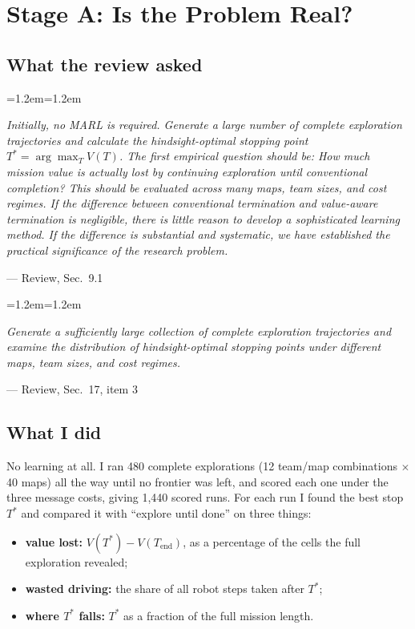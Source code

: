 \documentclass[11pt,a4paper]{article}
\newenvironment{review}[1]
  {\par\smallskip\noindent\begin{minipage}{\linewidth}\begin{list}{}{\leftmargin=1.2em\rightmargin=1.2em}\item[]%
   \def\reviewsrc{#1}\small\itshape\color{black!80}}
  {\par\hfill\upshape\footnotesize --- Review, \reviewsrc\end{list}\end{minipage}\par\smallskip}
\begin{document}
\section{Stage A: Is the Problem Real?}

\subsection{What the review asked}

\begin{review}{Sec.~9.1}
Initially, no MARL is required. Generate a large number of complete exploration trajectories and calculate the hindsight-optimal stopping point $T^* = \arg\max_T V(T)$. The first empirical question should be: How much mission value is actually lost by continuing exploration until conventional completion? This should be evaluated across many maps, team sizes, and cost regimes. If the difference between conventional termination and value-aware termination is negligible, there is little reason to develop a sophisticated learning method. If the difference is substantial and systematic, we have established the practical significance of the research problem.
\end{review}

\begin{review}{Sec.~17, item 3}
Generate a sufficiently large collection of complete exploration trajectories and examine the distribution of hindsight-optimal stopping points under different maps, team sizes, and cost regimes.
\end{review}

\subsection{What I did}

No learning at all. I ran 480 complete explorations (12 team/map combinations $\times$ 40 maps) all the way until no frontier was left, and scored each one under the three message costs, giving 1,440 scored runs. For each run I found the best stop $T^*$ and compared it with ``explore until done'' on three things:
\begin{itemize}
  \item \textbf{value lost:} $V(T^*) - V(T_{\text{end}})$, as a percentage of the cells the full exploration revealed;
  \item \textbf{wasted driving:} the share of all robot steps taken after $T^*$;
  \item \textbf{where $T^*$ falls:} $T^*$ as a fraction of the full mission length.
\end{itemize}
\end{document}
